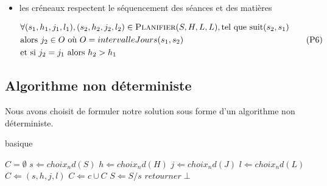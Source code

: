\begin{itemize}
    \item les créneaux respectent le séquencement des séances et des matières

        \begin{equation}\label{eqn:p6}
            \begin{split}
                & \forall(s_1, h_1, j_1, l_1), (s_2, h_2, j_2, l_2)
                \in \textsc{Planifier}(S, H, L, L),
                \text{tel que} \  \text{suit}(s_2, s_1)\\
                & \text{alors} \  j_2 \in O
                \  \text{où} \  O = intervalleJours(s_1, s_2)\\
                & \text{et si} \  j_2 = j_1 \  \text{alors} \  h_2 > h_1
            \end{split}
            \tag{P6}
        \end{equation}

\end{itemize}

\subsection{Algorithme non déterministe}

Nous avons choisit de formuler notre solution sous forme d'un algorithme non déterministe.

\begin{algorithm}                    
\caption{basique}      
\label{alg1}                           
\begin{algorithmic}                    %
    \REQUIRE $C = \emptyset$
        \STATE $s \Leftarrow choix_nd(S)$
        \STATE $h \Leftarrow choix_nd(H)$
        \STATE $j \Leftarrow choix_nd(J)$
        \STATE $l \Leftarrow choix_nd(L)$
        \STATE $C \Leftarrow (s, h, j, l)$
            \STATE $C \Leftarrow c \cup C$
            \STATE $S \Leftarrow S / s$
        \ELSE
            \STATE $retourner \perp$
        \ENDIF
    \ENDWHILE
\end{algorithmic}
\end{algorithm}
